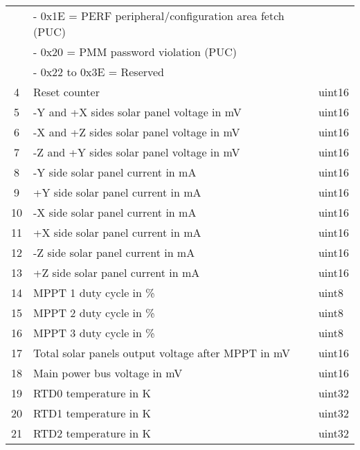 \begin{longtable}[c]{cL{0.82\textwidth}l}
        & - 0x1E = PERF peripheral/configuration area fetch (PUC)           &        \\
        & - 0x20 = PMM password violation (PUC)                             &        \\
        & - 0x22 to 0x3E = Reserved                                         &        \\
    4   & Reset counter                                                     & uint16 \\
    5   & -Y and +X sides solar panel voltage in mV                         & uint16 \\
    6   & -X and +Z sides solar panel voltage in mV                         & uint16 \\
    7   & -Z and +Y sides solar panel voltage in mV                         & uint16 \\
    8   & -Y side solar panel current in mA                                 & uint16 \\
    9   & +Y side solar panel current in mA                                 & uint16 \\
    10  & -X side solar panel current in mA                                 & uint16 \\
    11  & +X side solar panel current in mA                                 & uint16 \\
    12  & -Z side solar panel current in mA                                 & uint16 \\
    13  & +Z side solar panel current in mA                                 & uint16 \\
    14  & MPPT 1 duty cycle in \%                                           & uint8 \\
    15  & MPPT 2 duty cycle in \%                                           & uint8 \\
    16  & MPPT 3 duty cycle in \%                                           & uint8 \\
    17  & Total solar panels output voltage after MPPT in mV                & uint16 \\
    18  & Main power bus voltage in mV                                      & uint16 \\
    19  & RTD0 temperature in K                                             & uint32 \\
    20  & RTD1 temperature in K                                             & uint32 \\
    21  & RTD2 temperature in K                                             & uint32 \\

\end{longtable}
